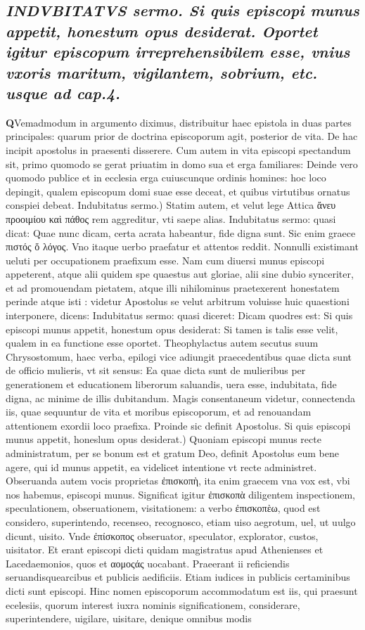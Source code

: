 \documentclass{article}
\begin{document}
\begin{pages}
\subsection*{\textit{\huge\textbf{I}\normalsize NDVBITATVS sermo. Si quis episcopi munus appetit, honestum opus desiderat. Oportet igitur episcopum irreprehensibilem esse, vnius vxoris maritum, vigilantem, sobrium, etc. usque ad cap.4. }}\pstart \huge\textbf{Q}\normalsize Vemadmodum in argumento diximus, distribuitur haec epistola in duas partes principales: quarum prior de doctrina episcoporum agit, posterior de vita. De hac incipit apostolus in praesenti disserere. Cum autem in vita episcopi spectandum sit, primo quomodo se gerat priuatim in domo sua et erga familiares: Deinde vero quomodo publice et in ecclesia erga cuiuscunque  ordinis homines: hoc loco depingit, qualem episcopum domi suae esse deceat, et quibus virtutibus ornatus conspiei debeat.  \pend\pstart Indubitatus sermo.) Statim autem, et velut lege Attica ἄνευ προοιμίου καὶ πάθος rem aggreditur, vti saepe alias. Indubitatus sermo: quasi dicat: Quae nunc dicam, certa acrata habeantur, fide digna sunt. Sic enim graece πιστός ὅ λόγος. Vno itaque  uerbo praefatur et attentos reddit. Nonnulli existimant ueluti per occupationem praefixum esse. Nam cum diuersi munus episcopi appeterent, atque  alii quidem spe quaestus aut gloriae, alii sine dubio synceriter, et ad promouendam pietatem, atque  illi nihilominus praetexerent honestatem perinde atque  isti : videtur Apostolus se velut arbitrum voluisse huic quaestioni interponere, dicens: Indubitatus sermo: quasi diceret: Dicam quodres est: Si quis episcopi munus appetit, honestum opus desiderat: Si tamen is talis esse velit, qualem in ea functione esse oportet. Theophylactus autem secutus suum Chrysostomum, haec verba, epilogi vice adiungit praecedentibus quae dicta sunt de officio mulieris, vt sit sensus: Ea quae dicta sunt de mulieribus per generationem et educationem liberorum saluandis, uera esse, indubitata, fide digna, ac minime de illis dubitandum. Magis consentaneum videtur, connectenda iis, quae sequuntur de vita et moribus episcoporum, et ad renouandam attentionem exordii loco praefixa. Proinde sic definit Apostolus.  \pend\pstart Si quis episcopi munus appetit, honeslum opus desiderat.) Quoniam episcopi munus recte administratum, per se bonum est et gratum Deo, definit Apostolus eum bene agere, qui id munus appetit, ea videlicet intentione vt recte administret. Obseruanda autem vocis proprietas ἐπισκοπὴ, ita enim graecem vna vox est, vbi nos habemus, episcopi munus. Significat igitur ἐπισκοπὰ diligentem inspectionem, speculationem, obseruationem, visitationem: a verbo ἐπισκοπὲω, quod est considero, superintendo, recenseo, recognosco, etiam uiso aegrotum, uel, ut uulgo dicunt, uisito. Vnde ἐπίσκοπος obseruator, speculator, explorator, custos, uisitator. Et erant episcopi dicti quidam magistratus apud Athenienses et Lacedaemonios, quos et αομοςάς uocabant. Praeerant ii reficiendis seruandisquearcibus et publicis aedificiis. Etiam iudices in publicis certaminibus dicti sunt episcopi. Hinc nomen episcoporum accommodatum est iis, qui praesunt ecelesiis, quorum interest iuxra nominis significationem, considerare, superintendere, uigilare, uisitare, denique  omnibus modis 
\end{pages}
\end{document}
